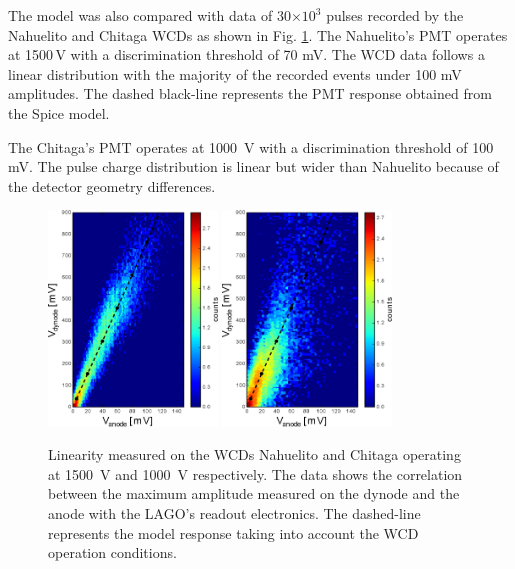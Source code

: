 \documentclass[letterpaper, 10 pt, conference]{ieeeconf}  %
\begin{document}
The model was also compared with data of 30$\times 10^3$ pulses recorded by the Nahuelito and Chitaga WCDs as shown in Fig. \ref{Nahuelito_Chitaga}. The Nahuelito's PMT operates at 1500\,V with a discrimination threshold of 70 mV. The WCD data follows a linear distribution with the majority of the recorded events under 100 mV amplitudes. The dashed black-line represents the PMT response obtained from the Spice model.

The Chitaga's PMT operates at 1000~V with a discrimination threshold of 100 mV. The pulse charge distribution is linear but wider than Nahuelito because of the detector geometry differences.


\begin{figure}[p]
\begin{center}
\includegraphics[width=0.4\textwidth]{Figures/Nahuelito.eps}
\includegraphics[width=0.4\textwidth]{Figures/Chitaga.eps}
\caption{Linearity measured on the WCDs Nahuelito and Chitaga operating at 1500~V and 1000~V respectively. The data shows the correlation between the maximum amplitude measured on the dynode and the anode with the LAGO's readout electronics. The dashed-line represents the model response taking into account the WCD operation conditions.}
\label{Nahuelito_Chitaga}
\end{center}
\end{figure}
\end{document}

